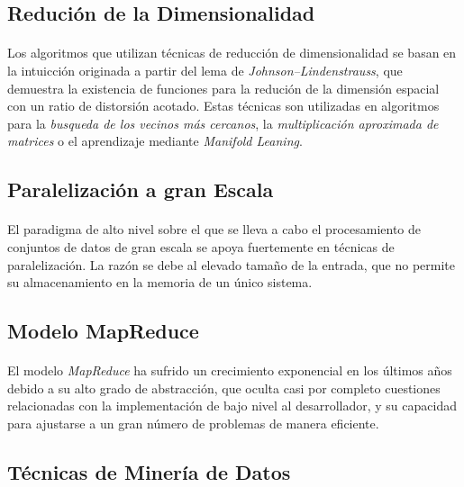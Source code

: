 \documentclass{subfiles}
\begin{document}
      \subsection{Redución de la Dimensionalidad}

        \paragraph{}
        Los algoritmos que utilizan técnicas de reducción de dimensionalidad se basan en la intuicción originada a partir del lema de \emph{Johnson–Lindenstrauss}, que demuestra la existencia de funciones para la redución de la dimensión espacial con un ratio de distorsión acotado. Estas técnicas son utilizadas en algoritmos para la \emph{busqueda de los vecinos más cercanos}, la \emph{multiplicación aproximada de matrices} o el aprendizaje mediante \emph{Manifold Leaning}.

      \subsection{Paralelización a gran Escala}

        \paragraph{}
        El paradigma de alto nivel sobre el que se lleva a cabo el procesamiento de conjuntos de datos de gran escala se apoya fuertemente en técnicas de paralelización. La razón se debe al elevado tamaño de la entrada, que no permite su almacenamiento en la memoria de un único sistema.

        \subsection{Modelo MapReduce}

          \paragraph{}
          El modelo \emph{MapReduce} ha sufrido un crecimiento exponencial en los últimos años debido a su alto grado de abstracción, que oculta casi por completo cuestiones relacionadas con la implementación de bajo nivel al desarrollador, y su capacidad para ajustarse a un gran número de problemas de manera eficiente.

      \subsection{Técnicas de Minería de Datos}
\end{document}

